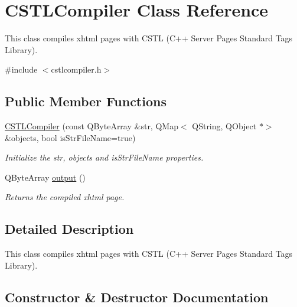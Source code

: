 \hypertarget{class_c_s_t_l_compiler}{}\section{C\+S\+T\+L\+Compiler Class Reference}
\label{class_c_s_t_l_compiler}


This class compiles xhtml pages with C\+S\+TL (C++ Server Pages Standard Tags Library).  




{\ttfamily \#include $<$cstlcompiler.\+h$>$}

\subsection*{Public Member Functions}
\begin{DoxyCompactItemize}
\item 
\mbox{\hyperlink{class_c_s_t_l_compiler_ad29e2a98129d37e8b4f332f93a66736c}{C\+S\+T\+L\+Compiler}} (const Q\+Byte\+Array \&str, Q\+Map$<$ Q\+String, Q\+Object $\ast$$>$ \&objects, bool is\+Str\+File\+Name=true)
\begin{DoxyCompactList}\small\item\em Initialize the str, objects and is\+Str\+File\+Name properties. \end{DoxyCompactList}\item 
Q\+Byte\+Array \mbox{\hyperlink{class_c_s_t_l_compiler_a3cce5a503e81c5de099859fe0ae1c386}{output}} ()
\begin{DoxyCompactList}\small\item\em Returns the compiled xhtml page. \end{DoxyCompactList}\end{DoxyCompactItemize}


\subsection{Detailed Description}
This class compiles xhtml pages with C\+S\+TL (C++ Server Pages Standard Tags Library). 

\subsection{Constructor \& Destructor Documentation}
\mbox{\label{class_c_s_t_l_compiler_ad29e2a98129d37e8b4f332f93a66736c}} 
